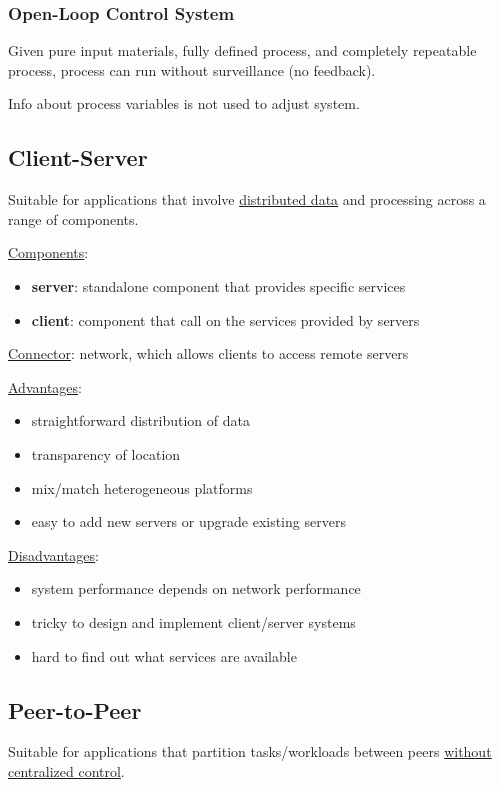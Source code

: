 \documentclass[11pt]{article}
\begin{document}
\subsubsection{Open-Loop Control System}
\label{sec:orgb789843}
Given pure input materials, fully defined process, and completely
repeatable process, process can run without surveillance (no
feedback).

Info about process variables is not used to adjust system.
\subsection{Client-Server}
\label{sec:org0ce86e7}
Suitable for applications that involve \uline{distributed data} and processing
across a range of components.

\uline{Components}:
\begin{itemize}
\item \textbf{server}: standalone component that provides specific services
\item \textbf{client}: component that call on the services provided by servers
\end{itemize}

\uline{Connector}: network, which allows clients to access remote servers

\uline{Advantages}:
\begin{itemize}
\item straightforward distribution of data
\item transparency of location
\item mix/match heterogeneous platforms
\item easy to add new servers or upgrade existing servers
\end{itemize}

\uline{Disadvantages}:
\begin{itemize}
\item system performance depends on network performance
\item tricky to design and implement client/server systems
\item hard to find out what services are available
\end{itemize}
\subsection{Peer-to-Peer}
\label{sec:org33b918d}
Suitable for applications that partition tasks/workloads between peers
\uline{without centralized control}.
\end{document}
